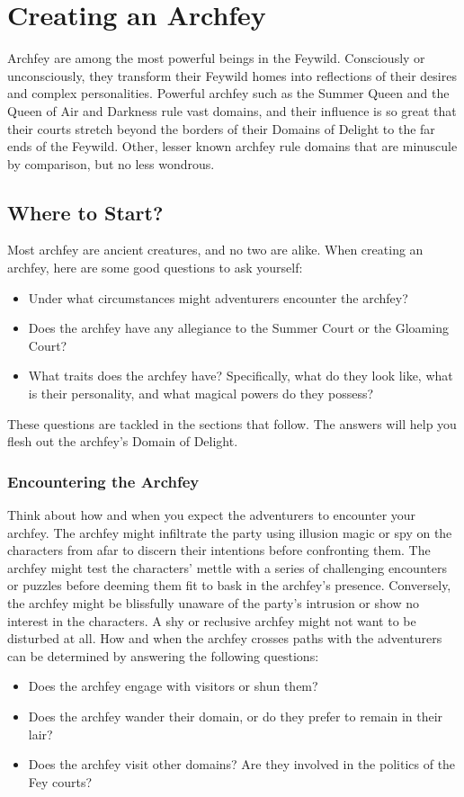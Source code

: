 \documentclass[10pt,a4paper,twoside,twocolumn,openany,nodeprecatedcode,bg=print]{dndbook}
\begin{document}
\chapter{Creating an Archfey}
Archfey are among the most powerful beings in the Feywild. Consciously or unconsciously, they transform their Feywild homes into reflections of their desires and complex personalities. Powerful archfey such as the Summer Queen and the Queen of Air and Darkness rule vast domains, and their influence is so great that their courts stretch beyond the borders of their Domains of Delight to the far ends of the Feywild. Other, lesser known archfey rule domains that are minuscule by comparison, but no less wondrous.
\section{Where to Start?}
Most archfey are ancient creatures, and no two are alike. When creating an archfey, here are some good questions to ask yourself:
\begin{itemize}

\item Under what circumstances might adventurers encounter the archfey?
\item Does the archfey have any allegiance to the Summer Court or the Gloaming Court?
\item What traits does the archfey have? Specifically, what do they look like, what is their personality, and what magical powers do they possess?
\end{itemize}


These questions are tackled in the sections that follow. The answers will help you flesh out the archfey's Domain of Delight.
\subsection{Encountering the Archfey}
Think about how and when you expect the adventurers to encounter your archfey. The archfey might infiltrate the party using illusion magic or spy on the characters from afar to discern their intentions before confronting them. The archfey might test the characters' mettle with a series of challenging encounters or puzzles before deeming them fit to bask in the archfey's presence. Conversely, the archfey might be blissfully unaware of the party's intrusion or show no interest in the characters. A shy or reclusive archfey might not want to be disturbed at all.
How and when the archfey crosses paths with the adventurers can be determined by answering the following questions:
\begin{itemize}

\item Does the archfey engage with visitors or shun them?
\item Does the archfey wander their domain, or do they prefer to remain in their lair?
\item Does the archfey visit other domains? Are they involved in the politics of the Fey courts?
\end{itemize}
\end{document}

